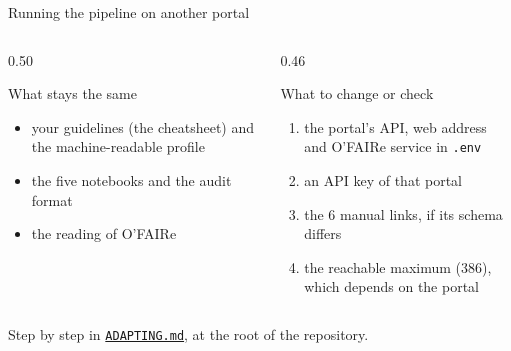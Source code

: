 \documentclass[aspectratio=169,10pt]{beamer}
\newcommand{\evidence}[1]{{\scriptsize\color{epgrey}#1}}
\newcommand{\code}[1]{\texttt{\small #1}}
\begin{document}
\begin{frame}{Running the pipeline on another portal}
  \begin{columns}[T]
    \begin{column}{0.50\textwidth}
      \begin{exampleblock}{What stays the same}
        \small
        \begin{itemize}
          \item your guidelines (the cheatsheet) and the machine-readable profile
          \item the five notebooks and the audit format
          \item the reading of O'FAIRe
        \end{itemize}
      \end{exampleblock}
    \end{column}
    \begin{column}{0.46\textwidth}
      \begin{block}{What to change or check}
        \small
        \begin{enumerate}
          \item the portal's API, web address and O'FAIRe service in \code{.env}
          \item an API key of that portal
          \item the 6 manual links, if its schema differs
          \item the reachable maximum (386), which depends on the portal
        \end{enumerate}
      \end{block}
    \end{column}
  \end{columns}
  \vfill
  \evidence{Step by step in \href{https://github.com/EarthPortal/SA_Management/blob/main/ADAPTING.md}{\code{ADAPTING.md}}, at the root of the repository.}
\end{frame}
\end{document}
